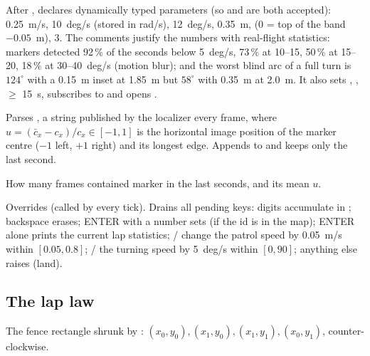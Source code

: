 After , declares dynamically typed parameters (so  and
 are both accepted):  0.25~m/s,  10~deg/s (stored in rad/s),
 12~deg/s,  0.35~m,  (0 = top of the band $-0.05$~m),
 3. The comments justify the numbers with real-flight statistics: markers detected 92\,\% of
the seconds below 5~deg/s, 73\,\% at 10--15, 50\,\% at 15--20, 18\,\% at 30--40~deg/s (motion blur); and the
worst blind arc of a full turn is $124^\circ$ with a 0.15~m inset at 1.85~m but $58^\circ$ with 0.35~m at 2.0~m.
It also sets , ,  $\ge$ 15~s, subscribes to
 and opens .

Parses , a string  published by the localizer every frame, where
$u = (\bar c_x - c_x)/c_x \in [-1, 1]$ is the horizontal image position of the marker centre ($-1$ left, $+1$
right) and  its longest edge. Appends  to  and keeps only
the last second.

How many frames contained marker  in the last  seconds, and its mean $u$.

Overrides  (called by  every tick). Drains all pending keys: digits
accumulate in ; backspace erases; ENTER with a number sets  (if the id is in the
map); ENTER alone prints the current lap statistics; \code{+}/\code{-} change the patrol speed by
0.05~m/s within $[0.05, 0.8]$; \code{*}/\code{/} the turning speed by 5~deg/s within $[0, 90]$; anything else
raises  (land).

\subsection{The lap law}

The fence rectangle shrunk by : $(x_0,y_0), (x_1,y_0), (x_1,y_1), (x_0,y_1)$, counter-clockwise.

